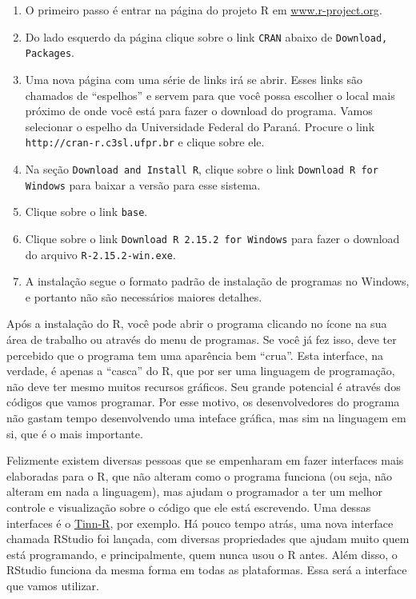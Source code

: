 \documentclass[a4paper,12pt]{article}\usepackage{graphicx, color}
\providecommand{\R}{\textsf{R}\xspace}
\providecommand{\RStudio}{\textsf{RStudio}\xspace}
\begin{document}
\begin{enumerate}
\item O primeiro passo é entrar na página do projeto \R em
\url{www.r-project.org}.
\item Do lado esquerdo da página clique sobre o link \texttt{CRAN}
  abaixo de \texttt{Download, Packages}.
\item Uma nova página com uma série de links irá se abrir. Esses links
  são chamados de ``espelhos'' e servem para que você possa escolher o
  local mais próximo de onde você está para fazer o download do
  programa. Vamos selecionar o espelho da Universidade Federal do
  Paraná. Procure o link \texttt{http://cran-r.c3sl.ufpr.br} e clique sobre
  ele.
\item Na seção \texttt{Download and Install R}, clique sobre o link
  \texttt{Download R for Windows} para baixar a versão para esse
  sistema.
\item Clique sobre o link \texttt{base}.
\item Clique sobre o link \texttt{Download R 2.15.2 for Windows} para
  fazer o download do arquivo \texttt{R-2.15.2-win.exe}.
\item A instalação segue o formato padrão de instalação de programas no
  Windows, e portanto não são necessários maiores detalhes.
\end{enumerate}

Após a instalação do \R, você pode abrir o programa clicando no ícone na
sua área de trabalho ou através do menu de programas. Se você já fez
isso, deve ter percebido que o programa tem uma aparência bem
``crua''. Esta interface, na verdade, é apenas a ``casca'' do \R, que
por ser uma linguagem de programação, não deve ter mesmo muitos recursos
gráficos. Seu grande potencial é através dos códigos que vamos
programar. Por esse motivo, os desenvolvedores do programa não gastam
tempo desenvolvendo uma inteface gráfica, mas sim na linguagem em si,
que é o mais importante.

Felizmente existem diversas pessoas que se empenharam em fazer
interfaces mais elaboradas para o \R, que não alteram como o programa
funciona (ou seja, não alteram em nada a linguagem), mas ajudam o
programador a ter um melhor controle e visualização sobre o código que
ele está escrevendo. Uma dessas interfaces é o
\href{http://www.sciviews.org/Tinn-R}{Tinn-R}, por exemplo. Há pouco
tempo atrás, uma nova interface chamada \RStudio foi lançada, com
diversas propriedades que ajudam muito quem está programando, e
principalmente, quem nunca usou o \R antes. Além disso, o \RStudio
funciona da mesma forma em todas as plataformas. Essa será a interface
que vamos utilizar.
\end{document}
